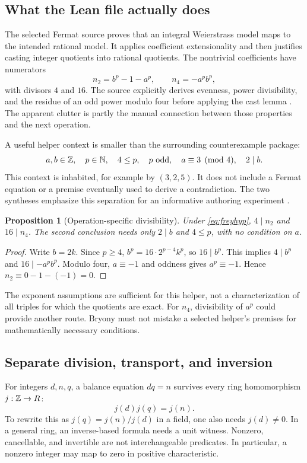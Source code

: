 \documentclass[11pt,a4paper]{article}
\newtheorem{proposition}[theorem]{Proposition}
\theoremstyle{definition}\newtheorem{definition}[theorem]{Definition}
\theoremstyle{remark}\newtheorem{remark}[theorem]{Remark}
\begin{document}
\subsection{What the Lean file actually does}
The selected Fermat source proves that an integral Weierstrass model maps to the intended rational model. It applies coefficient extensionality and then justifies casting integer quotients into rational quotients. The nontrivial coefficients have numerators
\[
 n_2=b^p-1-a^p,\qquad n_4=-a^p b^p,
\]
with divisors $4$ and $16$. The source explicitly derives evenness, power divisibility, and the residue of an odd power modulo four before applying the cast lemma \cite{frey}. The apparent clutter is partly the manual connection between those properties and the next operation.

A useful helper context is smaller than the surrounding counterexample package:
\begin{equation}\label{eq:freyhyp}
 a,b\in\mathbb Z,\quad p\in\mathbb N,\quad 4\le p,\quad p\text{ odd},
 \quad a\equiv3\pmod4,\quad 2\mid b.
\end{equation}
This context is inhabited, for example by $(3,2,5)$. It does not include a Fermat equation or a premise eventually used to derive a contradiction. The two syntheses emphasize this separation for an informative authoring experiment \cite{synA,synB}.

\begin{proposition}[Operation-specific divisibility]
Under \eqref{eq:freyhyp}, $4\mid n_2$ and $16\mid n_4$. The second conclusion needs only $2\mid b$ and $4\le p$, with no condition on $a$.
\end{proposition}
\begin{proof}
Write $b=2k$. Since $p\ge4$, $b^p=16\cdot 2^{p-4}k^p$, so $16\mid b^p$. This implies $4\mid b^p$ and $16\mid-a^pb^p$. Modulo four, $a\equiv-1$ and oddness gives $a^p\equiv-1$. Hence $n_2\equiv0-1-(-1)=0$.
\end{proof}

The exponent assumptions are sufficient for this helper, not a characterization of all triples for which the quotients are exact. For $n_4$, divisibility of $a^p$ could provide another route. Bryony must not mistake a selected helper's premises for mathematically necessary conditions.

\subsection{Separate division, transport, and inversion}
For integers $d,n,q$, a balance equation $dq=n$ survives every ring homomorphism $j:\mathbb Z\to R$:
\[
 j(d)j(q)=j(n).
\]
To rewrite this as $j(q)=j(n)/j(d)$ in a field, one also needs $j(d)\ne0$. In a general ring, an inverse-based formula needs a unit witness. Nonzero, cancellable, and invertible are not interchangeable predicates. In particular, a nonzero integer may map to zero in positive characteristic.
\end{document}
